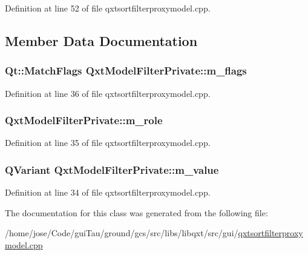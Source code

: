 Definition at line 52 of file qxtsortfilterproxymodel.\-cpp.



\subsection{Member Data Documentation}
\hypertarget{class_qxt_model_filter_private_a31236dfd8fa7945fcc1bb17d2c9f4715}{
\subsubsection[{m\-\_\-flags}]{\setlength{\rightskip}{0pt plus 5cm}Qt\-::\-Match\-Flags Qxt\-Model\-Filter\-Private\-::m\-\_\-flags}}\label{class_qxt_model_filter_private_a31236dfd8fa7945fcc1bb17d2c9f4715}


Definition at line 36 of file qxtsortfilterproxymodel.\-cpp.

\hypertarget{class_qxt_model_filter_private_a895e81d0e4515bbb42c878cc371271c1}{
\subsubsection[{m\-\_\-role}]{ Qxt\-Model\-Filter\-Private\-::m\-\_\-role}}\label{class_qxt_model_filter_private_a895e81d0e4515bbb42c878cc371271c1}


Definition at line 35 of file qxtsortfilterproxymodel.\-cpp.

\hypertarget{class_qxt_model_filter_private_ad6c574b0f94910a465989b89f0f64250}{
\subsubsection[{m\-\_\-value}]{\setlength{\rightskip}{0pt plus 5cm}Q\-Variant Qxt\-Model\-Filter\-Private\-::m\-\_\-value}}\label{class_qxt_model_filter_private_ad6c574b0f94910a465989b89f0f64250}


Definition at line 34 of file qxtsortfilterproxymodel.\-cpp.



The documentation for this class was generated from the following file\-:\begin{DoxyCompactItemize}
\item 
/home/jose/\-Code/gui\-Tau/ground/gcs/src/libs/libqxt/src/gui/\hyperlink{qxtsortfilterproxymodel_8cpp}{qxtsortfilterproxymodel.\-cpp}\end{DoxyCompactItemize}
